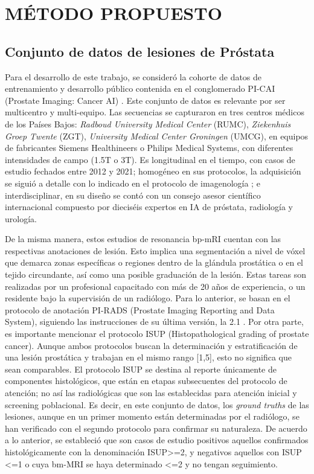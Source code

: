 \chapter{MÉTODO PROPUESTO}


\section{Conjunto de datos de lesiones de Próstata}

Para el desarrollo de este trabajo, se consideró la cohorte de datos de entrenamiento y desarrollo público  contenida en el conglomerado PI-CAI (Prostate Imaging: Cancer AI) . Este conjunto de datos es relevante por ser multicentro y multi-equipo. Las secuencias se capturaron en tres centros médicos de los Países Bajos: \textit{Radboud University Medical Center} (RUMC), \textit{Ziekenhuis Groep Twente} (ZGT), \textit{University Medical Center Groningen} (UMCG), en equipos de fabricantes Siemens Healthineers o Philips Medical Systems, con diferentes intensidades de campo (1.5T o 3T). Es longitudinal en el tiempo, con casos de estudio fechados entre 2012 y 2021; homogéneo en sus protocolos, la adquisición se siguió a detalle con lo indicado en el protocolo de imagenología ; e interdisciplinar, en su diseño se contó con un consejo asesor científico internacional compuesto por dieciséis expertos en IA de próstata, radiología y urología.

De la misma manera, estos estudios de resonancia bp-mRI cuentan con las respectivas anotaciones de lesión. Esto implica una segmentación a nivel de vóxel que demarca zonas específicas o regiones dentro de la glándula prostática o en el tejido circundante, así como una posible graduación de la lesión. Estas tareas son realizadas por un profesional capacitado con más de 20 años de experiencia, o un residente bajo la supervisión de un radiólogo. Para lo anterior, se basan en el protocolo de anotación PI-RADS (Prostate Imaging Reporting and Data System), siguiendo las instrucciones de su última versión, la 2.1 . Por otra parte, es importante mencionar el protocolo ISUP (Histopathological grading of prostate cancer). Aunque ambos protocolos buscan la determinación y estratificación de una lesión prostática y trabajan en el mismo rango [1,5], esto no significa que sean comparables. El protocolo ISUP se destina al reporte únicamente de componentes histológicos, que están en etapas subsecuentes del protocolo de atención; no así las radiológicas que son las establecidas para atención inicial y screening poblacional. Es decir, en este conjunto de datos, los \textit{ground truths} de las lesiones, aunque en un primer momento están determinadas por el radiólogo, se han verificado con el segundo protocolo para confirmar su naturaleza. De acuerdo a lo anterior, se estableció que son casos de estudio positivos aquellos confirmados histológicamente con la denominación ISUP>=2, y negativos aquellos con ISUP <=1 o cuya bm-MRI se haya determinado <=2 y no tengan seguimiento.

